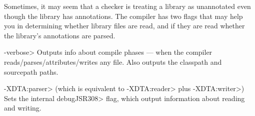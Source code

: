 Sometimes, it may seem that a checker is treating a library as unannotated
even though the library has annotations.  The compiler has two flags that
may help you in determining whether library files are read, and if they are
read whether the library's annotations are parsed.

\begin{description}
\item \<-verbose>
  Outputs info about compile phases --- when the compiler
  reads/parses/attributes/writes any file.  Also outputs the classpath and
  sourcepath paths.
\item \<-XDTA:parser> (which is equivalent to \<-XDTA:reader> plus \<-XDTA:writer>)
  Sets the internal \<debugJSR308> flag, which output information about
  reading and writing.
\end{description}


